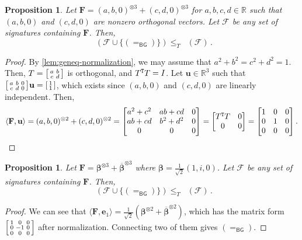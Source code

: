 \documentclass[11pt]{article}
\newtheorem{proposition}[theorem]{Proposition}
\DeclareMathOperator{\holts}{Holant^*_3}
\newcommand{\db}{\mathsf{B}}
\newcommand{\dg}{\mathsf{G}}
\newcommand{\teh}{^{\otimes 3}}
\newcommand{\tew}{^{\otimes 2}}
\begin{document}
\begin{proposition}\label{lem:geneq-eqbg}
  Let $\mathbf{F} =  (a, b, 0)\teh + (c, d, 0)\teh$ for $a, b, c, d \in \mathbb{R}$ such that $(a, b, 0)$ and $(c, d, 0)$ are nonzero orthogonal vectors.
  Let $\mathcal{F}$ be any set of signatures containing $\mathbf{F}$.
  Then, 
  \[
    \holts(\mathcal{F} \cup \{(=_{\db \dg})\}) \le_T \holts(\mathcal{F}) \, .
  \]
\end{proposition}
\begin{proof}
  By \cref{lem:geneq-normalization}, we may assume that $a^2 + b^2 = c^2 + d^2 = 1$.
  Then, $T = \begin{bsmallmatrix}
    a & b \\
    c & d
    \end{bsmallmatrix}$ is orthogonal, and $T^{\tt T}T = I$.
  Let $\mathbf{u} \in \mathbb{R}^3$ such that $\begin{bsmallmatrix}
    a & b & 0 \\
    c & d & 0
    \end{bsmallmatrix} \mathbf{u} = \begin{bsmallmatrix}
    1 \\ 1 
  \end{bsmallmatrix}$, which exists since $(a, b, 0)$ and $(c, d, 0)$ are linearly independent.
  Then,
  \[
    \langle \mathbf{F}, \mathbf{u} \rangle = (a, b, 0)\tew + (c, d, 0)\tew = \begin{bmatrix}
      a^2 + c^2 & ab + cd & 0 \\
      ab + cd & b^2 + d^2 & 0 \\
      0 & 0 & 0
      \end{bmatrix} = 
      \begin{bmatrix}
          T^{\tt T} T & 0 \\
          0 & 0
      \end{bmatrix}
      = \begin{bmatrix}
      1 & 0 & 0\\
      0 & 1 & 0 \\
      0 & 0 & 0
    \end{bmatrix}.
  \]
\end{proof}

\begin{proposition}\label{lem:z-eqbg}
  Let $\mathbf{F} = \boldsymbol{\beta} \teh + \overline{\boldsymbol{\beta}} \teh$ where $\boldsymbol{\beta} = \frac{1}{\sqrt{2}} (1, i, 0)$.
  Let $\mathcal{F}$ be any set of signatures containing $\mathbf{F}$.
  Then, 
  \[
    \holts(\mathcal{F} \cup \{(=_{\db \dg})\}) \le_T \holts(\mathcal{F}) \, .
  \]
\end{proposition}
\begin{proof}
  We can see that $\langle \mathbf{F}, \mathbf{e}_1 \rangle = \frac{1}{\sqrt{2}}( \boldsymbol{\beta} \tew + \overline{\boldsymbol{\beta}} \tew)$, which has the matrix form $\begin{bsmallmatrix}
    1 & 0 & 0 \\
    0 & -1 & 0 \\
    0 & 0 & 0
  \end{bsmallmatrix}$ after normalization.
  Connecting two of them gives $(=_{\db \dg})$.
\end{proof}
\end{document}
